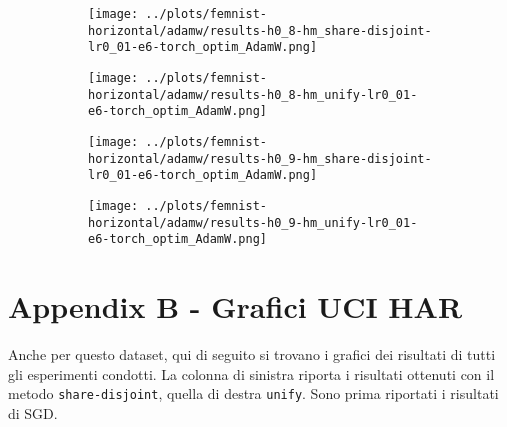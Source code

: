 \begin{figure}[htbp]  %
    \centering
    \begin{subfigure}[b]{0.47\textwidth}
        \centering
        \texttt{[image: ../plots/femnist-horizontal/adamw/results-h0\_8-hm\_share-disjoint-lr0\_01-e6-torch\_optim\_AdamW.png]}
    \end{subfigure}
    \hfill
    \begin{subfigure}[b]{0.47\textwidth}
        \centering
        \texttt{[image: ../plots/femnist-horizontal/adamw/results-h0\_8-hm\_unify-lr0\_01-e6-torch\_optim\_AdamW.png]}
    \end{subfigure}
\end{figure}
\begin{figure}[htbp]  %
    \centering
    \begin{subfigure}[b]{0.47\textwidth}
        \centering
        \texttt{[image: ../plots/femnist-horizontal/adamw/results-h0\_9-hm\_share-disjoint-lr0\_01-e6-torch\_optim\_AdamW.png]}
    \end{subfigure}
    \hfill
    \begin{subfigure}[b]{0.47\textwidth}
        \centering
        \texttt{[image: ../plots/femnist-horizontal/adamw/results-h0\_9-hm\_unify-lr0\_01-e6-torch\_optim\_AdamW.png]}
    \end{subfigure}
\end{figure}

\chapter{Appendix B - Grafici UCI HAR}
Anche per questo dataset, qui di seguito si trovano i grafici dei
risultati di tutti gli esperimenti condotti. La colonna di sinistra 
riporta i risultati ottenuti con il metodo \texttt{share-disjoint}, 
quella di destra \texttt{unify}. Sono prima riportati i risultati 
di SGD.

